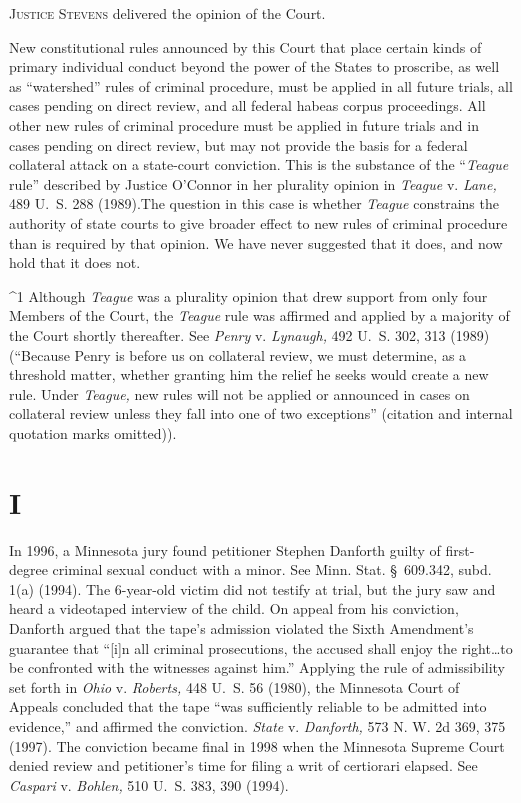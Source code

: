 
\setcounter{page}{266}

  \textsc{Justice Stevens} delivered the opinion of the Court.

  New constitutional rules announced by this Court that place certain
kinds of primary individual conduct beyond the power of the States to
proscribe, as well as ``watershed'' rules of criminal procedure, must
be applied in all future trials, all cases pending on direct review, and
all federal habeas corpus proceedings. All other new rules of criminal
procedure must be applied in future trials and in cases pending on
direct review, but may not provide the basis for a federal collateral
attack on a state-court conviction. This is the substance of the
``\emph{Teague} rule'' described by Justice O'Connor in her plurality
opinion in \emph{Teague} v. \emph{Lane,} 489 U.~S. 288 (1989).\footnotemark[1] The
question in this case is whether \emph{Teague} constrains the authority of
state courts to give broader effect to new rules of criminal procedure
than is required by that opinion. We have never suggested that it does,
and now hold that it does not.

^1 Although \emph{Teague} was a plurality opinion that drew support from
only four Members of the Court, the \emph{Teague} rule was affirmed and
applied by a majority of the Court shortly thereafter. See \emph{Penry}
v. \emph{Lynaugh,} 492 U.~S. 302, 313 (1989) (``Because Penry is before
us on collateral review, we must determine, as a threshold matter,
whether granting him the relief he seeks would create a new rule.
Under \emph{Teague,} new rules will not be applied or announced in cases
on collateral review unless they fall into one of two exceptions''
(citation and internal quotation marks omitted)). \newpage 


\section{I}

  In 1996, a Minnesota jury found petitioner Stephen Danforth guilty
of first-degree criminal sexual conduct with a minor. See Minn. Stat.
\S~609.342, subd. 1(a) (1994). The 6-year-old victim did not testify
at trial, but the jury saw and heard a videotaped interview of the
child. On appeal from his conviction, Danforth argued that the tape's
admission violated the Sixth Amendment's guarantee that ``[i]n all
criminal prosecutions, the accused shall enjoy the right\dots to
be confronted with the witnesses against him.'' Applying the rule of
admissibility set forth in \emph{Ohio} v. \emph{Roberts,} 448 U.~S. 56
(1980), the Minnesota Court of Appeals concluded that the tape ``was
sufficiently reliable to be admitted into evidence,'' and affirmed the
conviction. \emph{State} v. \emph{Danforth,} 573 N. W. 2d 369, 375 (1997).
The conviction became final in 1998 when the Minnesota Supreme Court
denied review and petitioner's time for filing a writ of certiorari
elapsed. See \emph{Caspari} v. \emph{Bohlen,} 510 U.~S. 383, 390 (1994).

